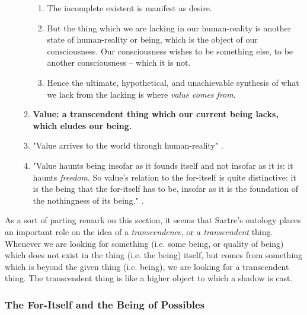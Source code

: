 \begin{enumerate}
\begin{enumerate}
\begin{enumerate}
      \item The incomplete existent is manifest as desire.
      \item But the thing which we are lacking in our human-reality is another state of human-reality or being, which is the object of our consciousness. Our consciousness wishes to be something else, to be another consciousness -- which it is not.
      \item Hence the ultimate, hypothetical, and unachievable synthesis of what we lack from the lacking is where \emph{value comes from}.
    \end{enumerate}
    \item \textbf{Value: a transcendent thing which our current being lacks, which eludes our being.} \autocite[146]{sartre}
    \item "Value arrives to the world through human-reality" \autocite[147]{sartre}.
    \item "Value haunts being insofar as it founds itself and not insofar as it is: it haunts \emph{freedom}. So value's relation to the for-itself is quite distinctive: it is the being that the for-itself has to be, insofar as it is the foundation of the nothingness of its being." \autocite[148]{sartre}.
  \end{enumerate}
\end{enumerate}

\noindent
As a sort of parting remark on this section, it seems that Sartre's ontology places an important role on the idea of a \emph{transcendence}, or a \emph{transcendent} thing. Whenever we are looking for something (i.e. some being, or quality of being) which does not exist in the thing (i.e. the being) itself, but comes from something which is beyond the given thing (i.e. being), we are looking for a transcendent thing. The transcendent thing is like a higher object to which a shadow is cast.

\subsubsection{The For-Itself and the Being of Possibles}

